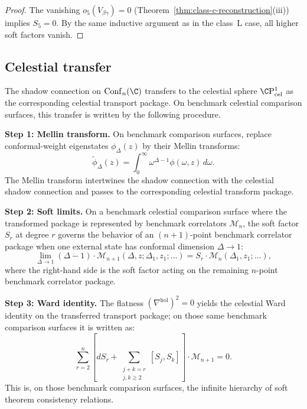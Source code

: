 \begin{proof}
The vanishing $o_5(V_{\beta\gamma}) = 0$ (Theorem~\ref{thm:class-c-reconstruction}(iii))
implies $S_5 = 0$. By the same inductive argument as in the class~L case, all higher
soft factors vanish.
\end{proof}

\subsection{Celestial transfer}

\begin{construction}
The shadow connection on $\mathrm{Conf}_n(\C)$ transfers to the celestial sphere
$\C\mathrm{P}^1_{\mathrm{cel}}$ as the corresponding celestial transport package.
On benchmark celestial comparison surfaces, this transfer is written by the
following procedure.

\medskip\noindent\textbf{Step 1: Mellin transform.}
On benchmark comparison surfaces, replace conformal-weight eigenstates
$\phi_\Delta(z)$ by their Mellin transforms:
\[
\widetilde{\phi}_\Delta(z) = \int_0^\infty \omega^{\Delta - 1} \phi(\omega, z)\, d\omega.
\]
The Mellin transform intertwines the shadow connection with the celestial shadow
connection and passes to the corresponding celestial transform package.

\medskip\noindent\textbf{Step 2: Soft limits.}
On a benchmark celestial comparison surface where the transformed package is
represented by benchmark correlators $\mathcal{M}_n$, the soft factor $S_r$ at
degree $r$ governs the behavior of an $(n+1)$-point benchmark correlator package
when one external state has conformal dimension $\Delta \to 1$:
\begin{equation}
\lim_{\Delta \to 1}
(\Delta - 1) \cdot \mathcal{M}_{n+1}(\Delta, z; \Delta_1, z_1; \ldots)
= S_r \cdot \mathcal{M}_n(\Delta_1, z_1; \ldots),
\end{equation}
where the right-hand side is the soft factor acting on the remaining $n$-point
benchmark correlator package.

\medskip\noindent\textbf{Step 3: Ward identity.}
The flatness $(\nabla^{\mathrm{hol}})^2 = 0$ yields the celestial Ward identity on
the transferred transport package; on those same benchmark comparison surfaces it
is written as:
\begin{equation}
\sum_{r=2}^{n}
\left[d S_r + \sum_{\substack{j + k = r \\ j,k \geq 2}} [S_j, S_k]\right]
\cdot \mathcal{M}_{n+1} = 0.
\end{equation}
This is, on those benchmark comparison surfaces, the infinite hierarchy of soft
theorem consistency relations.
\end{construction}

